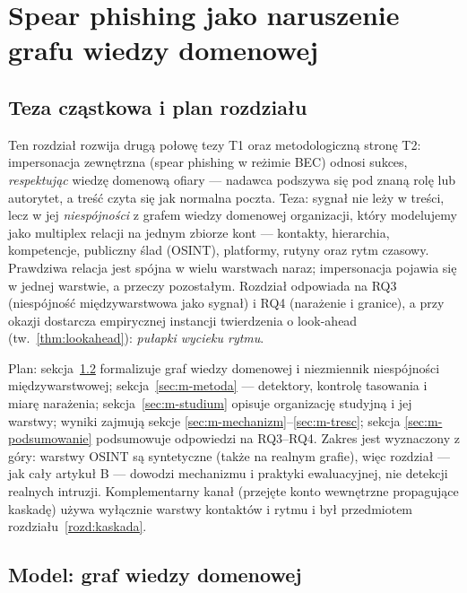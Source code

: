 \chapter{Spear phishing jako naruszenie grafu wiedzy domenowej}
\label{rozd:multipleks}

\section{Teza cząstkowa i plan rozdziału}
\label{sec:m-teza}

Ten rozdział rozwija drugą połowę tezy T1 oraz metodologiczną stronę
T2: impersonacja zewnętrzna (spear phishing w reżimie BEC) odnosi
sukces, \emph{respektując} wiedzę domenową ofiary --- nadawca podszywa
się pod znaną rolę lub autorytet, a treść czyta się jak normalna
poczta. Teza: sygnał nie leży w treści, lecz w jej
\emph{niespójności} z grafem wiedzy domenowej organizacji, który
modelujemy jako multiplex relacji na jednym zbiorze kont --- kontakty,
hierarchia, kompetencje, publiczny ślad (OSINT), platformy, rutyny
oraz rytm czasowy. Prawdziwa relacja jest spójna w wielu warstwach
naraz; impersonacja pojawia się w jednej warstwie, a przeczy
pozostałym. Rozdział odpowiada na RQ3 (niespójność międzywarstwowa
jako sygnał) i RQ4 (narażenie i granice), a przy okazji dostarcza
empirycznej instancji twierdzenia o look-ahead
(tw.~\ref{thm:lookahead}): \emph{pułapki wycieku rytmu}.

Plan: sekcja~\ref{sec:m-model} formalizuje graf wiedzy domenowej
i niezmiennik niespójności międzywarstwowej; sekcja~\ref{sec:m-metoda}
--- detektory, kontrolę tasowania i miarę narażenia;
sekcja~\ref{sec:m-studium} opisuje organizację studyjną i jej warstwy;
wyniki zajmują sekcje
\ref{sec:m-mechanizm}--\ref{sec:m-tresc}; sekcja
\ref{sec:m-podsumowanie} podsumowuje odpowiedzi na RQ3--RQ4. Zakres
jest wyznaczony z góry: warstwy OSINT są syntetyczne (także na
realnym grafie), więc rozdział --- jak cały artykuł B --- dowodzi
mechanizmu i praktyki ewaluacyjnej, nie detekcji realnych intruzji.
Komplementarny kanał (przejęte konto wewnętrzne propagujące kaskadę)
używa wyłącznie warstwy kontaktów i rytmu i był przedmiotem
rozdziału~\ref{rozd:kaskada}.

\section{Model: graf wiedzy domenowej}
\label{sec:m-model}

